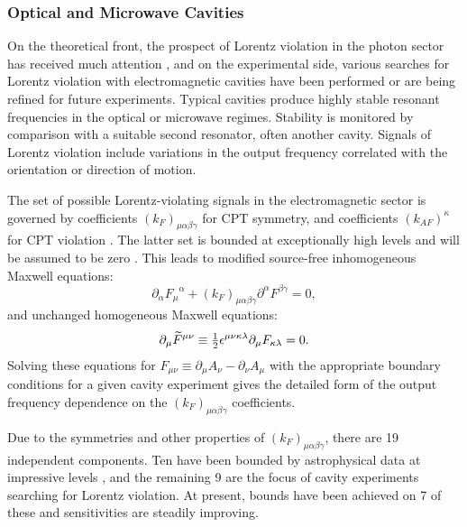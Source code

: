 \documentclass[twocolumn]{revtex4}
\def\al{\alpha}
\def\be{\beta}
\def\ga{\gamma}
\def\ep{\epsilon}
\def\la{\lambda}
\def\kaf{k_{AF}}
\def\kf{k_{F}}
\def\ka{\kappa}
\newcommand{\beq}{\begin{equation}}
\newcommand{\eeq}{\end{equation}}
\def\prt{\partial}
\def\mn{{\mu\nu}}
\def\half{{\textstyle{1\over 2}}}
\begin{document}
\subsubsection{Optical and Microwave Cavities}
On the theoretical front,
the prospect of Lorentz violation
in the photon sector has received much attention \cite{photonth},
and on the experimental side,
various searches for Lorentz violation with electromagnetic cavities
have been performed or are being refined for future experiments.
Typical cavities produce highly stable resonant frequencies
in the optical or microwave regimes.
Stability is monitored by comparison
with a suitable second resonator, often another cavity.
Signals of Lorentz violation include variations
in the output frequency correlated with the orientation
or direction of motion.

The set of possible Lorentz-violating signals
in the electromagnetic sector
is governed by coefficients $(\kf)_{\mu\al\be\ga}$
for CPT symmetry,
and coefficients $(\kaf)^\ka$ for CPT violation \cite{mewesPRD}.
The latter set is bounded at exceptionally
high levels and will be assumed to be zero \cite{carroll}.
This leads to
modified source-free inhomogeneous Maxwell equations:
\beq
\prt_\al{F_\mu}^\al+(\kf)_{\mu\al\be\ga}\prt^\al F^{\be\ga}=0 ,
\label{maxw1}
\eeq
and unchanged homogeneous Maxwell equations:
\beq
\prt_\mu \widetilde F^{\mn}
\equiv \half\ep^{\mu\nu\ka\la}\prt_\mu F_{\ka\la}=0 .
\label{maxw2}
\eeq
Solving these equations for
$F_\mn \equiv \prt_\mu A_\nu -\prt_\nu A_\mu$
with the appropriate boundary conditions for a given cavity
experiment gives the detailed form of
the output frequency dependence
on the $(\kf)_{\mu\al\be\ga}$ coefficients.

Due to the symmetries and other properties
of $(\kf)_{\mu\al\be\ga}$,
there are 19 independent components.
Ten have been bounded by astrophysical data
at impressive levels \cite{kappa},
and the remaining 9 are the focus of cavity experiments
searching for Lorentz violation.
At present,
bounds have been achieved on 7 of these
and sensitivities are steadily improving.
\end{document}
